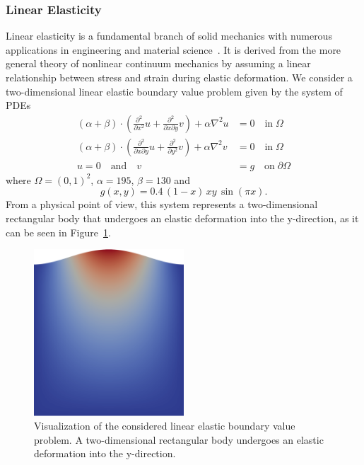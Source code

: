 \subsubsection{Linear Elasticity}
Linear elasticity is a fundamental branch of solid mechanics with numerous applications in engineering and material science~\cite{holzapfel2001nonlinear}.
It is derived from the more general theory of nonlinear continuum mechanics by assuming a linear relationship between stress and strain during elastic deformation.
We consider a two-dimensional linear elastic boundary value problem given by the system of PDEs
\begin{equation}
	\begin{split}
		(\alpha + \beta) \cdot (\frac{\partial^2}{\partial x^2} u + \frac{\partial^2}{\partial x \partial y} v) + \alpha \nabla^2 u & = 0 \quad \text{in} \; \Omega \\
		(\alpha + \beta) \cdot (\frac{\partial^2}{\partial x \partial y} u + \frac{\partial^2}{\partial y^2} v) + \alpha \nabla^2 v & = 0 \quad \text{in} \; \Omega \\
		u = 0 \quad \text{and} \quad v & = g \quad \text{on} \; \partial \Omega 
		\label{eq:linear-elasticity}
	\end{split}
\end{equation}
where $\Omega = (0,1)^2$, $\alpha = 195$, $\beta = 130$ and
\begin{equation*}
	g(x,y) = 0.4 \, (1 - x) \, x y \, \sin(\pi x).
\end{equation*}
From a physical point of view, this system represents a two-dimensional rectangular body that undergoes an elastic deformation into the y-direction, as it can be seen in Figure~\ref{fig:visualization-linear-elasticity}.
\begin{figure}
	\centering
	\includegraphics[width=0.5\textwidth]{figures/visualization-linear-elasticity1}
	\caption{Visualization of the considered linear elastic boundary value problem. A two-dimensional rectangular body undergoes an elastic deformation into the y-direction.}
	\label{fig:visualization-linear-elasticity}
\end{figure}
